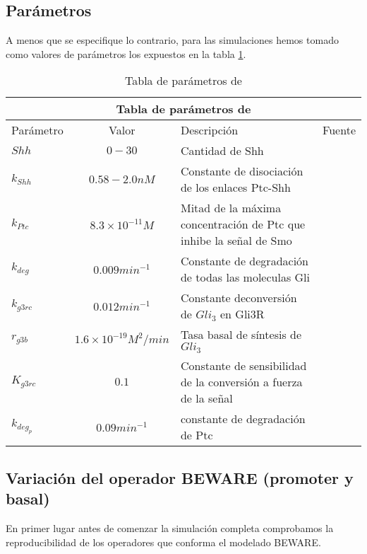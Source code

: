\subsection{Parámetros}
A menos que se especifique lo contrario, para las simulaciones hemos tomado como valores de parámetros los expuestos en la tabla \ref{tabla11}.
\begin{table}[h]
	\begin{center}
		
		\begin{tabular}{ |p{3cm}||c|p{3cm}|p{3cm}|  }
			\hline
			\multicolumn{4}{|c|}{Tabla de parámetros de \cite{schaffer}  } \\
			\hline
			Parámetro & Valor & Descripción & Fuente\\
			\hline
			$Shh $  & $0-30$    &\tiny{Cantidad de Shh} &   \cite{cambon1}\\
			$k_{Shh}$ &  $ 0.58-2.0nM$  & \tiny{Constante de disociación de los enlaces Ptc-Shh}   & \cite{cambon1}\\
			$k_{Ptc} $ & $8.3\times10^{-11}M$ & \tiny{ Mitad de la máxima concentración de Ptc que inhibe la señal de Smo } &  \cite{cambon1}\\
			$k_{deg}$   &$0.009min^{-1} $ & \tiny{ Constante de degradación de todas las moleculas Gli } &  \cite{cambon1}\\
			
			$k_{g3rc}$ &  $0.012min^{-1}$  & \tiny{ Constante deconversión de $Gli_3$ en Gli3R} & \cite{schaffer}\\
			$r_{g3b}$ & $1.6\times10^{-19}M^2/min$  & \tiny{ Tasa basal de síntesis de $Gli_3$ }   & \cite{schaffer}\\
			$K_{g3rc}$ & $0.1$ & \tiny{ Constante de sensibilidad de la conversión a fuerza de la señal }   & \cite{schaffer}\\
			
			$k_{deg_p}$& $0.09min^{-1} $ &  \tiny{constante de degradación de Ptc} & \cite{cambon1}\\
			
			\hline
		\end{tabular}
		
	\end{center}
	\caption{Tabla de parámetros de \cite{schaffer} }\label{param_2}
	\label{tabla11}
\end{table}

\subsection{Variación del operador BEWARE (promoter y basal)}
En primer lugar antes de comenzar la simulación completa comprobamos la reproducibilidad de los operadores que conforma el modelado BEWARE. 

